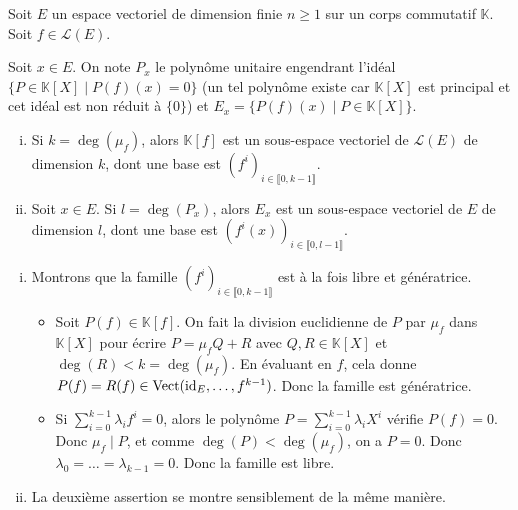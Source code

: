 





	Soit $E$ un espace vectoriel de dimension finie $n \geq 1$ sur un corps commutatif $\mathbb{K}$. Soit $f \in \mathcal{L}(E)$.

	\begin{notation}
		Soit $x \in E$. On note $P_x$ le polynôme unitaire engendrant l'idéal $\{ P \in \mathbb{K}[X] \mid P(f)(x) = 0 \}$ (un tel polynôme existe car $\mathbb{K}[X]$ est principal et cet idéal est non réduit à $\{ 0 \}$) et $E_x = \{ P(f)(x) \mid P \in \mathbb{K}[X] \}$.
	\end{notation}

	\begin{lemma}
		\label{invariants-de-similitude-1}
		\begin{enumerate}[(i)]
			\item Si $k = \deg(\mu_f)$, alors $\mathbb{K}[f]$ est un sous-espace vectoriel de $\mathcal{L}(E)$ de dimension $k$, dont une base est $(f^i)_{i \in \llbracket 0, k-1 \rrbracket}$.
			\item Soit $x \in E$. Si $l = \deg(P_x)$, alors $E_x$ est un sous-espace vectoriel de $E$ de dimension $l$, dont une base est $(f^i(x))_{i \in \llbracket 0, l-1 \rrbracket}$.
		\end{enumerate}
	\end{lemma}


	\begin{demonstration}
		\begin{enumerate}[(i)]
			\item Montrons que la famille $(f^i)_{i \in \llbracket 0, k-1 \rrbracket}$ est à la fois libre et génératrice.
			\begin{itemize}
				\item Soit $P(f) \in \mathbb{K}[f]$. On fait la division euclidienne de $P$ par $\mu_f$ dans $\mathbb{K}[X]$ pour écrire $P = \mu_f Q + R$ avec $Q, R \in \mathbb{K}[X]$ et $\deg(R) < k = \deg(\mu_f)$. En évaluant en $f$, cela donne $P(f) = R(f) \in \operatorname{Vect}(\operatorname{id}_E, \dots, f^{k-1})$. Donc la famille est génératrice.
				\item Si $\sum_{i=0}^{k-1} \lambda_i f^i = 0$, alors le polynôme $P = \sum_{i=0}^{k-1} \lambda_i X^i$ vérifie $P(f) = 0$. Donc $\mu_f \mid P$, et comme $\deg(P) < \deg(\mu_f)$, on a $P = 0$. Donc $\lambda_0 = \dots = \lambda_{k-1} = 0$. Donc la famille est libre.
			\end{itemize}
			\item La deuxième assertion se montre sensiblement de la même manière.
		\end{enumerate}
	\end{demonstration}

